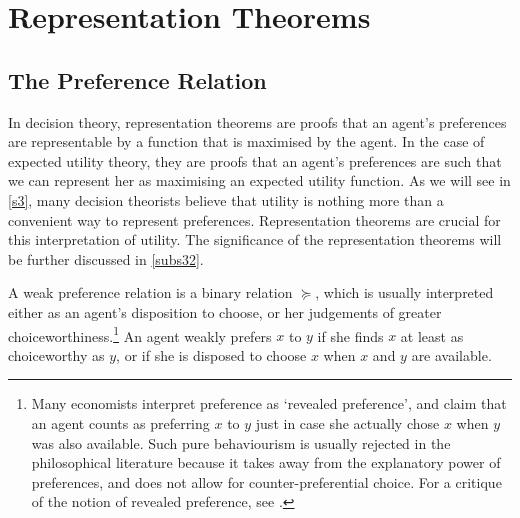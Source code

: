 \section{Representation Theorems} \label{s2}

\subsection{The Preference Relation}\label{subs21}

In decision theory, representation theorems are proofs that an agent's preferences are representable by a function that is maximised by the agent. In the case of expected utility theory, they are proofs that an agent's preferences are such that we can represent her as maximising an expected utility function. As we will see in \autoref{s3}, many decision theorists believe that utility is nothing more than a convenient way to represent preferences. Representation theorems are crucial for this interpretation of utility. The significance of the representation theorems will be further discussed in \autoref{subs32}.

A weak preference relation is a binary relation $\succcurlyeq$, which is usually interpreted either as an agent's disposition to choose, or her judgements of greater choiceworthiness.\footnote{Many economists interpret preference as `revealed preference', and claim that an agent counts as preferring $x$ to $y$ just in case she actually chose $x$ when $y$ was also available. Such pure behaviourism is usually rejected in the philosophical literature because it takes away from the explanatory power of preferences, and does not allow for counter-preferential choice. For a critique of the notion of revealed preference, see \citet{Hausman2000}.} An agent weakly prefers $x$ to $y$ if she finds $x$ at least as choiceworthy as $y$, or if she is disposed to choose $x$ when $x$ and $y$ are available.

